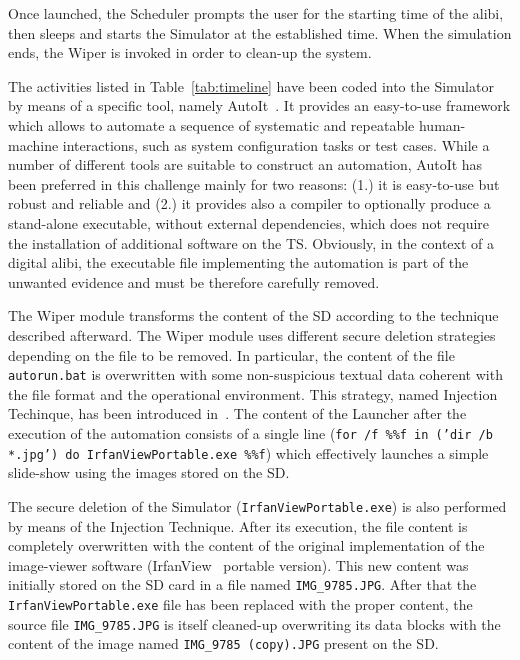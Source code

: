\documentclass[10pt, conference]{IEEEtran}
\begin{document}
Once launched, the Scheduler prompts the user for the starting time of the alibi, then sleeps and starts the Simulator at the established time. When the simulation ends, the Wiper is invoked in order to clean-up the system. 

The activities listed in Table~\ref{tab:timeline} have been coded into the Simulator by means of a specific tool, namely AutoIt~\cite{site:autoit}.
It provides an easy-to-use framework which allows to automate a sequence of systematic and repeatable human-machine interactions, such
as system configuration tasks or test cases. While a number of different tools are suitable to construct an automation, AutoIt has been 
preferred in this challenge mainly for two reasons: (1.) it is easy-to-use but robust and reliable and (2.) it provides also a compiler to
optionally produce a stand-alone executable, without external dependencies, which does not require the
installation of additional software on the TS. Obviously, in the context of a digital alibi, the executable file implementing the automation
is part of the unwanted evidence and must be therefore carefully removed.

The Wiper module transforms the content of the SD according to the technique described afterward. The Wiper module uses different secure
deletion strategies depending on the file to be removed. In particular, the content of the file \verb=autorun.bat= is overwritten with some non-suspicious textual data coherent with the file format and the operational environment. This strategy, named Injection Techinque, has been introduced in~\cite{securedel}.
The content of the Launcher after the execution of the automation consists of a single line ({\tt for /f \%\%f in ('dir /b *.jpg') do IrfanViewPortable.exe \%\%f}) which effectively launches a simple slide-show using the images stored on the SD.

The secure deletion of the Simulator (\verb=IrfanViewPortable.exe=) is also performed by means of the Injection Technique. After its execution,
the file content is completely overwritten with the content of the original implementation of the image-viewer software (IrfanView~\cite{irfan}
portable version). This new content was initially stored on the SD card in a file named \verb=IMG_9785.JPG=. After that the \verb=IrfanViewPortable.exe= file has been replaced with the proper content, the source file \verb=IMG_9785.JPG= is itself cleaned-up overwriting its data blocks with the content of the image named \verb=IMG_9785 (copy).JPG= present on the SD.
\end{document}
